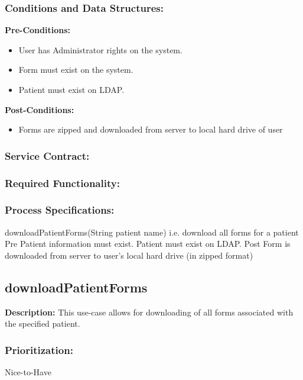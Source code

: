 \subsubsection{Conditions and Data Structures:}
\textbf{Pre-Conditions:}
\begin{itemize}
	\item User has Administrator rights on the system.
	\item Form must exist on the system.
	\item Patient must exist on LDAP.
\end{itemize}

\textbf{Post-Conditions:}	
\begin{itemize}
	\item Forms are zipped and downloaded from server to local hard drive of user
\end{itemize}
\subsubsection{Service Contract:} 
\subsubsection{Required Functionality:} 
\subsubsection{Process Specifications:}




downloadPatientForms(String patient name) 
i.e. download all forms for a patient	
Pre Patient information must exist.
	Patient must exist on LDAP.	
Post Form is downloaded from server to user's local hard drive (in zipped format)


\subsection{downloadPatientForms} %
\textbf{Description:}
This use-case allows for downloading of all forms associated with the specified patient.
\subsubsection{Prioritization:}
Nice-to-Have
